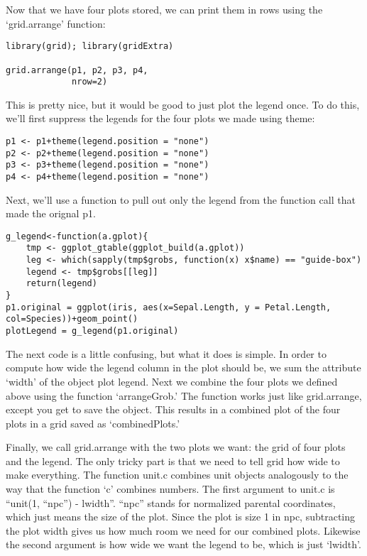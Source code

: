 \documentclass[11pt]{article}
\begin{document}
Now that we have four plots stored, we can print them in rows using
the `grid.arrange' function:

\begin{verbatim}
library(grid); library(gridExtra)

grid.arrange(p1, p2, p3, p4,
             nrow=2)
\end{verbatim}


This is pretty nice, but it would be good to just plot the legend
once. To do this, we'll first suppress the legends for the four plots
we made using theme:

\begin{verbatim}
p1 <- p1+theme(legend.position = "none")
p2 <- p2+theme(legend.position = "none")
p3 <- p3+theme(legend.position = "none")
p4 <- p4+theme(legend.position = "none")
\end{verbatim}

Next, we'll use a function to pull out only the legend from the
function call that made the orignal p1.

\begin{verbatim}
g_legend<-function(a.gplot){
    tmp <- ggplot_gtable(ggplot_build(a.gplot))
    leg <- which(sapply(tmp$grobs, function(x) x$name) == "guide-box")
    legend <- tmp$grobs[[leg]]
    return(legend)
}
p1.original = ggplot(iris, aes(x=Sepal.Length, y = Petal.Length, col=Species))+geom_point()
plotLegend = g_legend(p1.original)
\end{verbatim}

The next code is a little confusing, but what it does is simple. In
order to compute how wide the legend column in the plot should be, we
sum the attribute `width' of the object plot legend. Next we combine
the four plots we defined above using the function `arrangeGrob.' The
function works just like grid.arrange, except you get to save the
object. This results in a combined plot of the four plots in a grid
saved as `combinedPlots.'

Finally, we call grid.arrange with the two plots we want: the grid of
four plots and the legend. The only tricky part is that we need to
tell grid how wide to make everything. The function unit.c combines
unit objects analogously to the way that the function `c' combines
numbers. The first argument to unit.c is ``unit(1, ``npc'') - lwidth''. ``npc'' stands
for normalized parental coordinates, which just means the size of the
plot. Since the plot is size 1 in npc, subtracting the plot width
gives us how much room we need for our combined plots. Likewise the
second argument is how wide we want the legend to be, which is just
`lwidth'.
\end{document}
